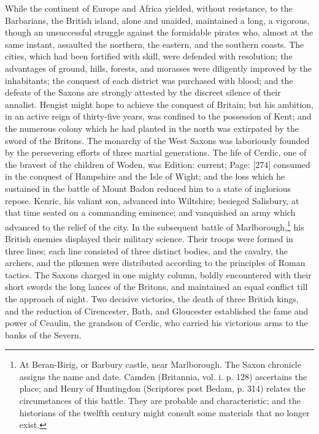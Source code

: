 While the continent of Europe and Africa yielded, without resistance, to the Barbarians, the British island, alone and unaided, maintained a long, a vigorous, though an unsuccessful struggle against the formidable pirates who, almost at the same instant, assaulted the northern, the eastern, and the southern coasts. The cities, which had been fortified with skill, were defended with resolution; the advantages of ground, hills, forests, and morasses were diligently improved by the inhabitants; the conquest of each district was purchased with blood; and the defeats of the Saxons are strongly attested by the discreet silence of their annalist. Hengist might hope to achieve the conquest of Britain; but his ambition, in an active reign of thirty-five years, was confined to the possession of Kent; and the numerous colony which he had planted in the north was extirpated by the sword of the Britons. The monarchy of the West Saxons was laboriously founded by the persevering efforts of three martial generations. The life of Cerdic, one of the bravest of the children of Woden, was Edition: current; Page: [274] consumed in the conquest of Hampshire and the Isle of Wight; and the loss which he sustained in the battle of Mount Badon reduced him to a state of inglorious repose. Kenric, his valiant son, advanced into Wiltshire; besieged Salisbury, at that time seated on a commanding eminence; and vanquished an army which advanced to the relief of the city. In the subsequent battle of Marlborough,\footnote{At Beran-Birig, or Barbury castle, near Marlborough. The Saxon chronicle assigns the name and date. Camden (Britannia, vol. i. p. 128) ascertains the place; and Henry of Huntingdon (Scriptores post Bedam, p. 314) relates the circumstances of this battle. They are probable and characteristic; and the historians of the twelfth century might consult some materials that no longer exist.} his British enemies displayed their military science. Their troops were formed in three lines; each line consisted of three distinct bodies, and the cavalry, the archers, and the pikemen were distributed according to the principles of Roman tactics. The Saxons charged in one mighty column, boldly encountered with their short swords the long lances of the Britons, and maintained an equal conflict till the approach of night. Two decisive victories, the death of three British kings, and the reduction of Cirencester, Bath, and Gloucester established the fame and power of Ceaulin, the grandson of Cerdic, who carried his victorious arms to the banks of the Severn.

